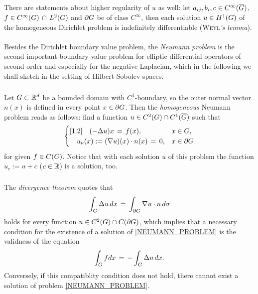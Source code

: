 \documentclass[11pt,twoside]{article}
\begin{document}
\subparagraph*{}
There are statements about higher regularity of $u$ as well:
let $a_{ij}, b_i, c \in C^{\infty}(\overline{G})$,
$f \in C^{\infty}(G) \, \cap \, L^2(G)$ and $\partial G$ be of class $C^{\infty}$,
then each solution $u \in H^1(G)$
of the homogeneous Dirichlet problem is indefinitely differentiable
(\textsc{Weyl}\textit{'s lemma}).

\paragraph{} %
Besides the Dirichlet boundary value problem,
the \textit{Neumann problem} is the second important boundary value problem
for elliptic differential operators of second order
and especially for the negative Laplacian,
which in the following we shall sketch in the setting of Hilbert-Sobolev spaces.

\subparagraph*{} %
Let $G \subset {\mathbb{R}}^d$ be a bounded domain with $C^1$-boundary,
so the outer normal vector $n(x)$ is defined in every point $x \in \partial G$.
Then the \textit{homogeneous} Neumann problem reads as follows:
find a function $u \in C^2(G) \cap C^1(\overline{G})$ such that
\begin{equation}\label{NEUMANN_PROBLEM}
\begin{cases}[1.2]
\quad (-\Delta u)x \,=\, f(x), & x \in G, \\
\quad u_{\nu}(x) := (\nabla u)(x) \cdot n(x) \,=\, 0, & x \in \partial G \\
\end{cases}
\end{equation}
for given $f \in C(G)$.
Notice that with each solution $u$ of this problem
the function $u_c := u+c$ ($c \in {\mathbb{R}}$) is a solution,
too.

\subparagraph*{} %
The \textit{divergence theorem} quotes that
\[
\int_{G} \Delta u \, dx \,=\, \int_{\partial G} \nabla u \cdot n \, d\sigma
\]
holds for every function $u \in C^2(G) \cap C(\partial G)$,
which implies that
a necessary condition for the existence of a solution
of \eqref{NEUMANN_PROBLEM} is the validness of the equation
\begin{equation}\label{NEUMANN_COMPATIBILITY_CONDITION}
\int_{G} f dx \,=\, -\int_{G} \Delta u \, dx.
\end{equation}
Conversely,
if this compatiblity condition does not hold,
there cannot exist a solution of problem \eqref{NEUMANN_PROBLEM}.
\end{document}
